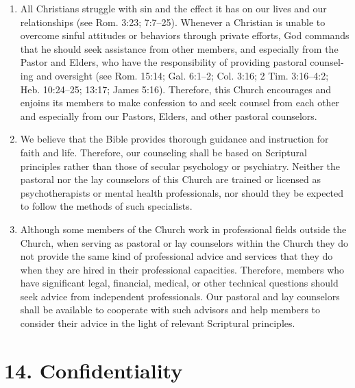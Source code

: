 \documentclass[
]{book}
\begin{document}
\begin{enumerate}
\def\labelenumi{\alph{enumi}.}
\item
  All Christians struggle with sin and the effect it has on our lives and our relationships (see Rom. 3:23; 7:7--25). Whenever a Christian is unable to overcome sinful attitudes or behaviors through private efforts, God commands that he should seek assistance from other members, and especially from the Pastor and Elders, who have the responsibility of providing pastoral coun­sel­ing and oversight (see Rom. 15:14; Gal. 6:1--2; Col. 3:16; 2 Tim. 3:16--4:2; Heb. 10:24--25; 13:17; James 5:16). Therefore, this Church encourages and enjoins its members to make confession to and seek counsel from each other and especially from our Pastors, Elders, and other pastoral counselors.
\item
  We believe that the Bible provides thorough guidance and instruction for faith and life. Therefore, our counseling shall be based on Scriptural principles rather than those of secular psychology or psychiatry. Neither the pastoral nor the lay counselors of this Church are trained or licensed as psycho­therapists or mental health professionals, nor should they be expected to follow the methods of such specialists.
\item
  Although some members of the Church work in professional fields outside the Church, when serving as pastoral or lay counselors within the Church they do not provide the same kind of professional advice and services that they do when they are hired in their professional capacities. Therefore, members who have significant legal, financial, medical, or other technical questions should seek advice from independent professionals. Our pastoral and lay counselors shall be available to cooperate with such advisors and help members to consider their advice in the light of relevant Scriptural principles.
\end{enumerate}

\hypertarget{confidentiality}{%
\section{14. Confidentiality}\label{confidentiality}}
\end{document}

